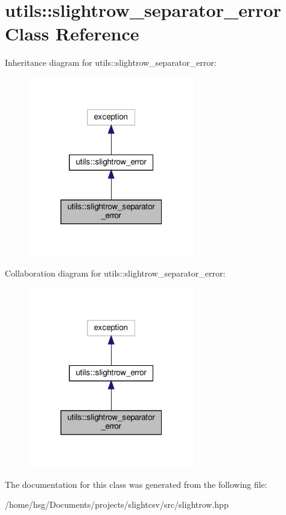 \hypertarget{classutils_1_1slightrow__separator__error}{}\section{utils\+:\+:slightrow\+\_\+separator\+\_\+error Class Reference}
\label{classutils_1_1slightrow__separator__error}


Inheritance diagram for utils\+:\+:slightrow\+\_\+separator\+\_\+error\+:\nopagebreak
\begin{figure}[H]
\begin{center}
\leavevmode
\includegraphics[width=205pt]{classutils_1_1slightrow__separator__error__inherit__graph}
\end{center}
\end{figure}


Collaboration diagram for utils\+:\+:slightrow\+\_\+separator\+\_\+error\+:\nopagebreak
\begin{figure}[H]
\begin{center}
\leavevmode
\includegraphics[width=205pt]{classutils_1_1slightrow__separator__error__coll__graph}
\end{center}
\end{figure}


The documentation for this class was generated from the following file\+:\begin{DoxyCompactItemize}
\item 
/home/hsg/\+Documents/projects/slightcsv/src/slightrow.\+hpp\end{DoxyCompactItemize}

